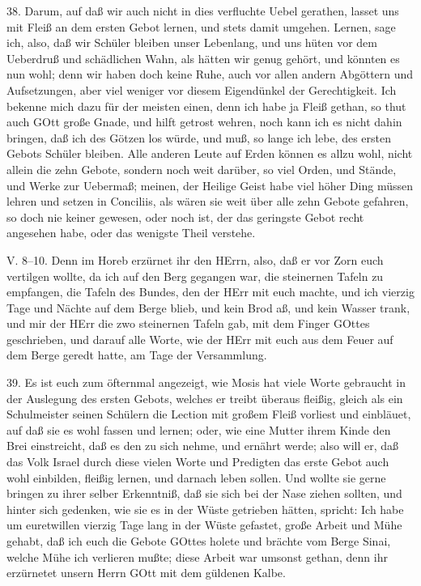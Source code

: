 38. Darum, auf daß wir auch nicht in dies verfluchte Uebel gerathen, lasset uns mit Fleiß an dem ersten Gebot lernen, und stets damit umgehen. Lernen, sage ich, also, daß wir Schüler bleiben unser Lebenlang, und uns hüten vor dem Ueberdruß und schädlichen Wahn, als hätten wir genug gehört, und könnten es nun wohl; denn wir haben doch keine Ruhe, auch vor allen andern Abgöttern und Aufsetzungen, aber viel weniger vor diesem Eigendünkel der Gerechtigkeit. Ich bekenne mich dazu für der meisten einen, denn ich habe ja Fleiß gethan, so thut auch GOtt große Gnade, und hilft getrost wehren, noch kann ich es nicht dahin bringen, daß ich des Götzen los würde, und muß, so lange ich lebe, des ersten Gebots Schüler bleiben. Alle anderen Leute auf Erden können es allzu wohl, nicht allein die zehn Gebote, sondern noch weit darüber, so viel Orden, und Stände, und Werke zur Uebermaß; meinen, der Heilige Geist habe viel höher Ding müssen lehren und setzen in Conciliis, als wären sie weit über alle zehn Gebote gefahren, so doch nie keiner gewesen, oder noch ist, der das geringste Gebot recht angesehen habe, oder das wenigste Theil verstehe.

\begin{schriftzitat}
V. 8–10. Denn im Horeb erzürnet ihr den HErrn, also, daß er vor Zorn euch vertilgen wollte, da ich auf den Berg gegangen war, die steinernen Tafeln zu empfangen, die Tafeln des Bundes, den der HErr mit euch machte, und ich vierzig Tage und Nächte auf dem Berge blieb, und kein Brod aß, und kein Wasser trank, und mir der HErr die zwo steinernen Tafeln gab, mit dem Finger GOttes geschrieben, und darauf alle Worte, wie der HErr mit euch aus dem Feuer auf dem Berge geredt hatte, am Tage der Versammlung.
\end{schriftzitat}

39. Es ist euch zum öfternmal angezeigt, wie Mosis hat viele Worte gebraucht in der Auslegung des ersten Gebots, welches er treibt überaus fleißig, gleich als ein Schulmeister seinen Schülern die Lection mit großem Fleiß vorliest und einbläuet, auf daß sie es wohl fassen und lernen; oder, wie eine Mutter ihrem Kinde den Brei einstreicht, daß es den zu sich nehme, und ernährt werde; also will er, daß das Volk Israel durch diese vielen Worte und Predigten das erste Gebot auch wohl einbilden, fleißig lernen, und darnach leben sollen. Und wollte sie gerne bringen zu ihrer selber Erkenntniß, daß sie sich bei der Nase ziehen sollten, und hinter sich gedenken, wie sie es in der Wüste getrieben hätten, spricht: Ich habe um euretwillen vierzig Tage lang in der Wüste gefastet, große Arbeit und Mühe gehabt, daß ich euch die Gebote GOttes holete und brächte vom Berge Sinai, welche Mühe ich verlieren mußte; diese Arbeit war umsonst gethan, denn ihr erzürnetet unsern Herrn GOtt mit dem güldenen Kalbe.

